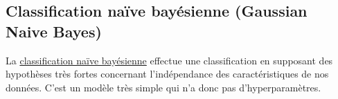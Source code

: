 \subsection{Classification naïve bayésienne (Gaussian Naive Bayes)}

La \href{https://scikit-learn.org/stable/modules/generated/sklearn.naive_bayes.GaussianNB.html}{classification naïve bayésienne} effectue une classification en supposant des hypothèses très fortes concernant l'indépendance des caractéristiques de nos données. C'est un modèle très simple qui n'a donc pas d'hyperparamètres.